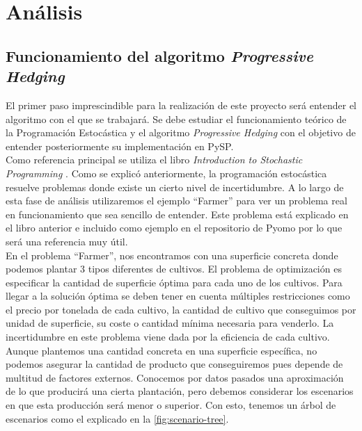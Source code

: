 \chapter{Análisis}
\label{ch:analisis}

\section{Funcionamiento del algoritmo \textit{Progressive Hedging}}


El primer paso imprescindible para la realización de este proyecto será entender el algoritmo con el que se trabajará. Se debe estudiar el funcionamiento teórico de la Programación Estocástica y el algoritmo \textit{Progressive Hedging} con el objetivo de entender posteriormente su implementación en PySP. \\

Como referencia principal se utiliza el libro {\it Introduction to Stochastic Programming} \cite{stochasticProgramming}. Como se explicó anteriormente, la programación estocástica resuelve problemas donde existe un cierto nivel de incertidumbre. A lo largo de esta fase de análisis utilizaremos el ejemplo ``Farmer'' para ver un problema real en funcionamiento que sea sencillo de entender. Este problema está explicado en el libro anterior e incluido como ejemplo en el repositorio de Pyomo por lo que será una referencia muy útil.\\

En el problema ``Farmer'', nos encontramos con una superficie concreta donde podemos plantar 3 tipos diferentes de cultivos. El problema de optimización es especificar la cantidad de superficie óptima para cada uno de los cultivos. Para llegar a la solución óptima se deben tener en cuenta múltiples restricciones como el precio por tonelada de cada cultivo, la cantidad de cultivo que conseguimos por unidad de superficie, su coste o cantidad mínima necesaria para venderlo. La incertidumbre en este problema viene dada por la eficiencia de cada cultivo. Aunque plantemos una cantidad concreta en una superficie específica, no podemos asegurar la cantidad de producto que conseguiremos pues depende de multitud de factores externos. Conocemos por datos pasados una aproximación de lo que producirá una cierta plantación, pero debemos considerar los escenarios en que esta producción será menor o superior. Con esto, tenemos un árbol de escenarios como el explicado en la \autoref{fig:scenario-tree}.\\

